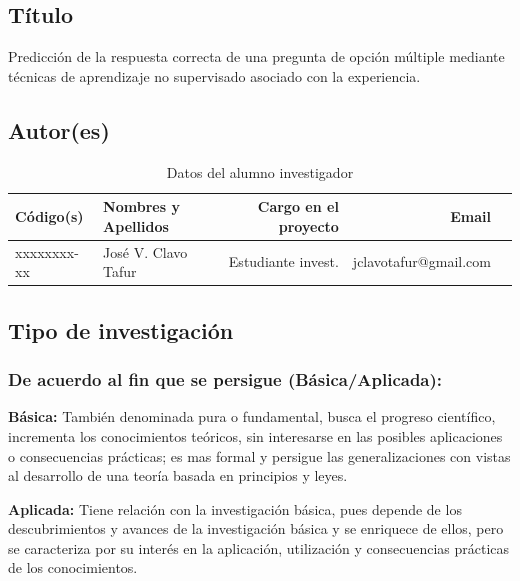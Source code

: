 \documentclass[a4paper, 12pt]{article}
\begin{document}
\subsection{Título}
Predicción de la respuesta correcta de una pregunta de opción múltiple mediante técnicas de aprendizaje no supervisado asociado con la experiencia.

\subsection{Autor(es)}
\begin{table}[h!]
 \caption{\small{Datos del alumno investigador}}
\begin{tabular}{llrrr} \toprule
{\bf Código(s)} & {\bf Nombres y Apellidos} & {\bf Cargo en el proyecto} & {\bf Email} \\ \midrule
xxxxxxxx-xx & José V. Clavo Tafur & Estudiante invest. & jclavotafur@gmail.com           \\
\end{tabular}
\end{table}



\subsection{Tipo de investigación}
\subsubsection{De acuerdo al fin que se persigue (Básica/Aplicada):} 

{\bf Básica:} También denominada pura o fundamental, busca el progreso científico, incrementa los conocimientos teóricos, sin interesarse en las posibles aplicaciones o consecuencias prácticas; es mas formal y persigue las generalizaciones con vistas al desarrollo de una teoría basada  en principios y leyes.\par
\vskip 0.3cm
{\bf Aplicada:} Tiene relación con la investigación básica, pues depende de los descubrimientos y avances de la investigación básica y se enriquece de ellos, pero se caracteriza por su interés en la aplicación, utilización y consecuencias prácticas de los conocimientos. 
                
\end{document}
